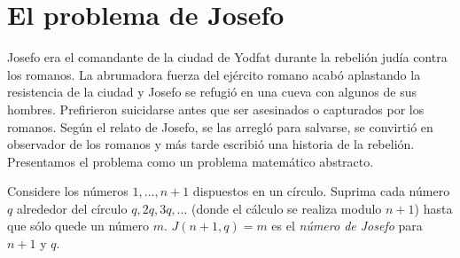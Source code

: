 
\section{El problema de Josefo}\label{s.josephus}

Josefo era el comandante de la ciudad de Yodfat durante la rebelión judía contra los romanos. La abrumadora fuerza del ejército romano acabó aplastando la resistencia de la ciudad y Josefo se refugió en una cueva con algunos de sus hombres. Prefirieron suicidarse antes que ser asesinados o capturados por los romanos. Según el relato de Josefo, se las arregló para salvarse, se convirtió en observador de los romanos y más tarde escribió una historia de la rebelión. Presentamos el problema como un problema matemático abstracto.

\begin{definition}
Considere los números $1,\ldots,n\!+\!1$ dispuestos en un círculo. Suprima cada número $q$ alrededor del círculo $q, 2q, 3q, \ldots$ (donde el cálculo se realiza modulo $n\!+\!1$) hasta que sólo quede un número $m$. $J(n+1,q)=m$ es el \emph{número de Josefo} para $n+1$ y $q$.
\end{definition}

